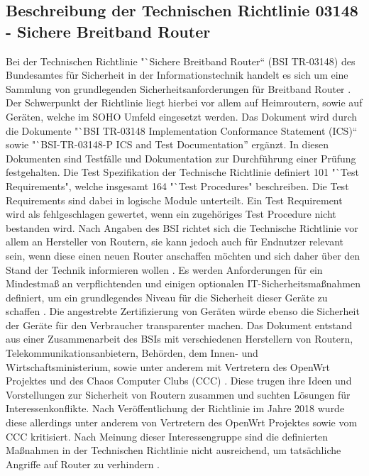 \documentclass[a4paper]{book}
\begin{document}
\begin{large}
\subsection[TR 03148 - Sichere Breitband Router]{Beschreibung der Technischen Richtlinie 03148 - Sichere Breitband Router}
\label{TR}
\begin{onehalfspace}
Bei der Technischen Richtlinie "`Sichere Breitband Router“ (BSI TR-03148) des Bundesamtes für Sicherheit in der Informationstechnik handelt es sich um eine Sammlung von grundlegenden Sicherheitsanforderungen für Breitband Router \cite[p.~3]{BundesamtfurSicherheitinderInformationstechnik.2020b}. Der Schwerpunkt der Richtlinie liegt hierbei vor allem auf Heimroutern, sowie auf Geräten, welche im SOHO Umfeld eingesetzt werden. Das Dokument wird durch die Dokumente "`BSI TR-03148 Implementation Conformance Statement (ICS)“ sowie "`BSI-TR-03148-P ICS and Test Documentation” ergänzt. In diesen Dokumenten sind Testfälle und Dokumentation zur Durchführung einer Prüfung festgehalten. Die Test Spezifikation der Technische Richtlinie definiert 101 "`Test Requirements"{}, welche insgesamt 164 "`Test Procedures"{} beschreiben. Die \glqq Test Requirements\grqq{} sind dabei in logische Module unterteilt. Ein \glqq Test Requirement\grqq{} wird als fehlgeschlagen gewertet, wenn ein zugehöriges \glqq Test Procedure\grqq{} nicht bestanden wird. Nach Angaben des BSI richtet sich die Technische Richtlinie vor allem an Hersteller von Routern, sie kann jedoch auch für Endnutzer relevant sein, wenn diese einen neuen Router anschaffen möchten und sich daher über den Stand der Technik informieren wollen \cite{BundesamtfurSicherheitinderInformationstechnik.e}. Es werden Anforderungen für ein Mindestmaß an verpflichtenden und einigen optionalen IT-Sicherheitsmaßnahmen definiert, um ein grundlegendes Niveau für die Sicherheit dieser Geräte zu schaffen \cite[p.~11]{BundesamtfurSicherheitinderInformationstechnik.2020b}. Die angestrebte Zertifizierung von Geräten würde ebenso die Sicherheit der Geräte für den Verbraucher transparenter machen.	\newline \indent
 	Das Dokument entstand aus einer Zusammenarbeit des BSIs mit verschiedenen Herstellern von Routern, Telekommunikationsanbietern, Behörden, dem Innen- und Wirtschaftsministerium, sowie unter anderem mit Vertretern des OpenWrt Projektes und des Chaos Computer Clubs (CCC) \cite{UlrichHottelet.16.11.2018}. Diese trugen ihre Ideen und Vorstellungen zur Sicherheit von Routern zusammen und suchten Lösungen für Interessenkonflikte. Nach Veröffentlichung der Richtlinie im Jahre 2018 wurde diese allerdings unter anderem von Vertretern des OpenWrt Projektes sowie vom CCC kritisiert. Nach Meinung dieser Interessengruppe sind die definierten Maßnahmen in der Technischen Richtlinie nicht ausreichend, um tatsächliche Angriffe auf Router zu verhindern \cite{CCCundOpenWRTkritisierenRouterTRalsFarce.19.11.2018}.\\

\end{onehalfspace}
\end{large}
\end{document}
